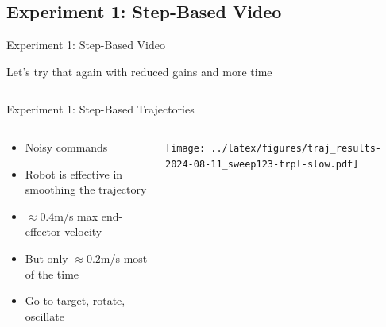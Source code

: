 \documentclass[16:9,en,navbarinfooter]{sdqbeamer}
\begin{document}
\subsection{Experiment 1: Step-Based Video}
\begin{frame}{Experiment 1: Step-Based Video}


	\vspace{1cm}
	Let's try that again with reduced gains and more time
	\begin{columns}[t]
		\vspace{1cm}
	\end{columns}

\end{frame}
\begin{frame}{Experiment 1: Step-Based Trajectories}

	\begin{columns}[t]
		\begin{column}{0.3\textwidth}
			\vspace{1cm}
			\begin{itemize}
				\item Noisy commands
				\item Robot is effective in smoothing the trajectory
				\item $\approx0.4$m/s max end-effector velocity
				\item But only $\approx0.2$m/s most of the time
				\item Go to target, rotate, oscillate
			\end{itemize}
		\end{column}
		\begin{column}{0.7\textwidth}
			\vspace{1cm}
			\texttt{[image: ../latex/figures/traj\_results-2024-08-11\_sweep123-trpl-slow.pdf]}
		\end{column}
	\end{columns}
\end{frame}
\end{document}
